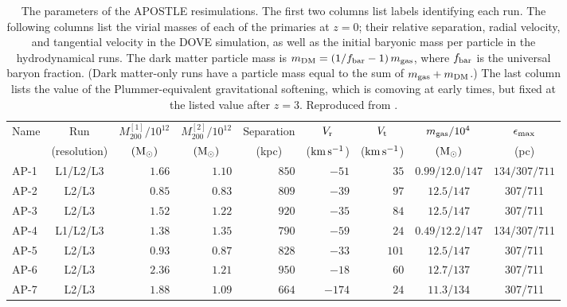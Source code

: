 \documentclass[10pt, a4paper]{article}
\newcommand{\Msun}{{\hbox{${\rm M}_\odot$}}}
\begin{document}
\begin{table}
\caption{The parameters of the {\small APOSTLE} resimulations. The first two columns list labels identifying each run. The following columns list the virial masses of each of the primaries at $z=0$; their relative separation, radial velocity, and tangential velocity in the {\small DOVE} simulation, as well as the initial baryonic mass per particle in the hydrodynamical runs. The dark matter particle mass is $m_{\rm DM}=(1/f_{\rm bar}-1) \, m_{\rm gas}$, where $f_{\rm bar}$ is the universal baryon fraction. (Dark matter-only runs have a particle mass equal to the sum of $m_{\rm gas}+m_{\rm DM}$.) The last column lists the value of the Plummer-equivalent gravitational softening, which is comoving at early times, but fixed at the listed value after $z=3$. Reproduced from \cite{2016MNRAS.457..844F}.}
\vspace{5pt}
\centering
\footnotesize
\begin {tabular}{lcrrrrrcc}
\hline 
\multicolumn{1}{c}{Name} &
\multicolumn{1}{c}{Run} &
\multicolumn{1}{c}{$M_{200}^{[1]}/10^{12}$} &
\multicolumn{1}{c}{$M_{200}^{[2]}/10^{12}$} &
\multicolumn{1}{c}{Separation} &
\multicolumn{1}{c}{$V_{\rm r}$} &
\multicolumn{1}{c}{$V_{\rm t}$} &
\multicolumn{1}{c}{$m_{\rm gas}/10^4$} &
\multicolumn{1}{c}{$\epsilon_{\rm {max}}$} \\
&
\multicolumn{1}{c}{(resolution)} &
\multicolumn{1}{c}{$(\Msun)$} &
\multicolumn{1}{c}{$(\Msun)$} &
\multicolumn{1}{c}{(kpc)} &
\multicolumn{1}{c}{(${\rm km}\,{\rm s}^{-1}$)} &
\multicolumn{1}{c}{(${\rm km}\,{\rm s}^{-1}$)} &
\multicolumn{1}{c}{$(\Msun)$} &
\multicolumn{1}{c}{(pc)} \\  
\hline
AP-1  &  L1/L2/L3   & $1.66$  &   $1.10$  &  $850$   &   $-51$   & $35$  & $0.99$/$12.0$/$147$ &  $134/307/711$ \\
AP-2  &  L2/L3   & $0.85$ & $0.83$   &  $809$   &   $-39$   & $97$  & $12.5$/$147$ &  307/711    \\
AP-3  &  L2/L3   & $1.52$  &   $1.22$  &  $920$   &   $-35$   & $84$  & $12.5$/$147$ &  307/711     \\
AP-4  &  L1/L2/L3   & $1.38$  &   $1.35$  &  $790$   &   $-59$   & $24$  & $0.49$/$12.2$/$147$ & 134/307/711  \\
AP-5  &  L2/L3   & $0.93$ &   $0.87$ &  $828$   &   $-33$   & $101$ & $12.5$/$147$ &  307/711 \\
AP-6  &  L2/L3   & $2.36$  &   $1.21$  &  $950$   &   $-18$   & $60$  & $12.7$/$137$ &  307/711 \\
AP-7  &  L2/L3   & $1.88$  &   $1.09$  &  $664$   &   $-174$  & $24$  & $11.3$/$134$ &  307/711 \\

\end{tabular}
\end{table}
\end{document}
